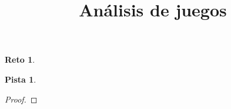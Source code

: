 \documentclass[12pt]{extarticle}
\title{Análisis de juegos}
\begin{document}
\newtheorem{ejer} {Reto}
\newtheorem{ejem} {Ejemplo}
\newtheorem{theorem} {Teorema}
\newtheorem*{demon} {Demostración}
\newtheorem*{pistas} {Pista}
\newtheorem*{pistas2} {Pista 2}
\newtheorem*{sol} {Solución}
\newtheorem{defin} {Definición}
\newenvironment{enumerar}{\begin{enumerate}\setlength{\parskip}{0pt}}
{\end{enumerate}}

\newcommand{\titulo}[1]{}
\newcommand{\tema}[1]{}
\newcommand{\temas}[1]{}
\newcommand{\dificultad}[1]{}
\newcommand{\fuente}[1]{}
\newcommand{\curso}[1]{}
\newcommand{\comentarios}[1]{}




\titulo{ %

}

\tema{
}

\temas{
}

\dificultad{


}

\fuente{
}

\curso{
}

\comentarios{

}

\begin{ejer}
\end{ejer}
\begin{pistas}
\end{pistas}

\begin{proof}
\end{proof}
\end{document}
